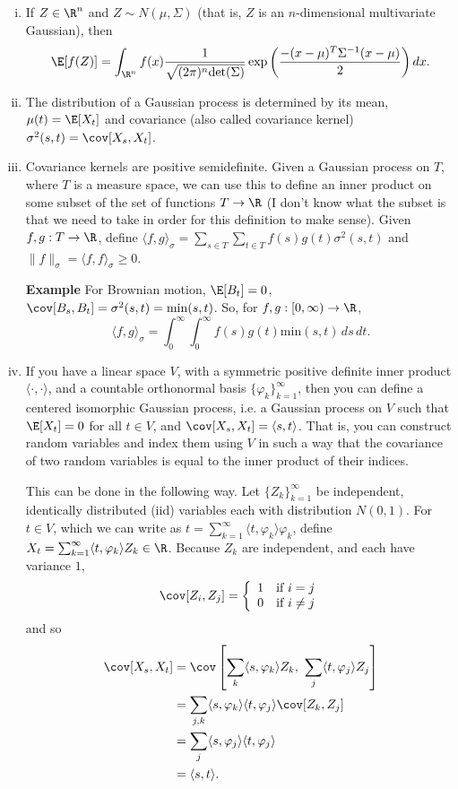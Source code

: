 \begin{enumerate}[(i)]

\item If $Z\in\R^n$ and $Z\sim N(\mu,\Sigma)$ (that is, $Z$ is an $n$-dimensional multivariate Gaussian), then \[\E[f(Z)]=\int_{\R^n}f(x)\dfrac{1}{\sqrt{(2\pi)^n\mathrm{det}(\Sigma)}}\exp\left(\dfrac{-(x-\mu)^T\Sigma^{-1}(x-\mu)}{2}\right)dx.\]

\item The distribution of a Gaussian process is determined by its mean, $\mu(t)=\E[X_t]$ and covariance (also called covariance kernel) $\sigma^2(s,t)=\cov[X_s,X_t]$.

\item Covariance kernels are positive semidefinite.  Given a Gaussian process on $T$, where $T$ is a measure space, we can use this to define an inner product on some subset of the set of functions $T\to\R$ (I don't know what the subset is that we need to take in order for this definition to make sense).  Given $f,g:T\to \R$, define $\langle f,g\rangle_{\sigma}=\sum_{s\in T}\sum_{t\in T}f(s)g(t)\sigma^2(s,t)$ and $\|f\|_\sigma=\langle f,f\rangle_\sigma\geq 0$.

\textbf{Example} For Brownian motion, $\E[B_t]=0$, $\cov[B_s,B_t]=\sigma^2(s,t)=\mathrm{min}(s,t)$.  So, for $f,g:[0,\infty)\to\R$, \[\langle f,g\rangle_\sigma=\int_0^\infty\int_0^\infty f(s)g(t)\mathrm{min}(s,t)\,ds\,dt.\]

\item If you have a linear space $V$, with a symmetric positive definite inner product $\langle\cdot,\cdot \rangle$, and a countable orthonormal basis $\{\varphi_k\}_{k=1}^{\infty}$, then you can define a centered isomorphic Gaussian process, i.e. a Gaussian process on $V$ such that $\E[X_t]=0$ for all $t\in V$, and $\cov[X_s,X_t]=\langle s,t\rangle$.  That is, you can construct random variables and index them using $V$ in such a way that the covariance of two random variables is equal to the inner product of their indices.

This can be done in the following way.  Let $\{Z_k\}_{k=1}^\infty$ be independent, identically distributed (iid) variables each with distribution $N(0,1)$.  For $t\in V$, which we can write as $t=\sum_{k=1}^\infty \langle t,\varphi_k\rangle \varphi_k$, define $X_t=\sum_{k=1}^\infty \langle t,\varphi_k\rangle Z_k\in\R$.  Because $Z_k$ are independent, and each have variance $1$, \[\cov[Z_i,Z_j]=\left\{\begin{array}{cc}
1 & \text{if }i=j\\
0 & \text{if }i\neq j\\
\end{array}\right.\]
and so \begin{align*}
\cov[X_s,X_t]&=\cov\left[\sum_k\langle s,\varphi_k\rangle Z_k,\,\,\sum_j\langle t,\varphi_j\rangle Z_j\right]\\
&=\sum_{j,k}\langle s,\varphi_k\rangle \langle t,\varphi_j\rangle \cov[Z_k,Z_j]\\
&=\sum_j\langle s,\varphi_j\rangle \langle t,\varphi_j\rangle\\
&=\langle s,t\rangle.
\end{align*}


\end{enumerate}
